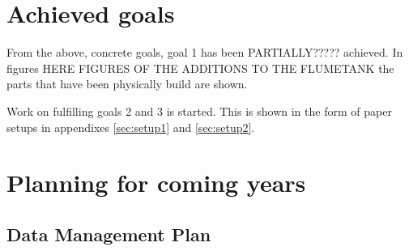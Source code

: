 \section{Achieved goals}
\label{sec:deliv_achieved_goals}
From the above, concrete goals, goal 1 has been PARTIALLY????? achieved. In figures HERE FIGURES OF THE ADDITIONS TO THE FLUMETANK the parts that have been physically build are shown. \par 
Work on fulfilling goals 2 and 3 is started. This is shown in the form of paper setups in appendixes \ref{sec:setup1} and \ref{sec:setup2}.

\section{Planning for coming years}
\label{sec:deliv_what_to_come}



\subsection{Data Management Plan}
\label{sec:deliv_DMP}
